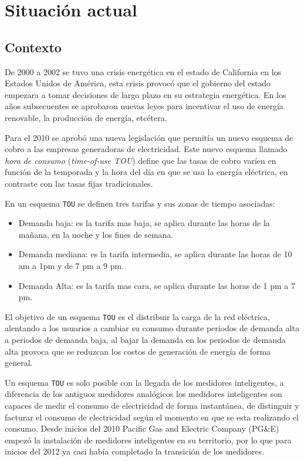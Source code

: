 \chapter{Situación actual}

\section{Contexto}
De 2000 a 2002 se tuvo una crisis energética en el estado de California en los
Estados Unidos de América, esta crisis provocó que el gobierno del estado empezara a
tomar decisiones de largo plazo en su estrategia energética. En los años
subsecuentes se aprobaron nuevas leyes para incentivar el uso de energía renovable,
la producción de energía, etcétera.

Para el 2010 se aprobó una nueva legislación que permitía un nuevo esquema
de cobro a las empresas generadoras de electricidad. Este nuevo esquema
llamado \textit{hora de consumo} (\textit{time-of-use TOU}) define que las
tasas de cobro varíen en función de la temporada y la hora del día en que
se usa la energía eléctrica, en contraste con las tasas fijas tradicionales.

En un esquema \texttt{TOU} se definen tres tarifas y sus zonas de tiempo asociadas:

\begin{itemize}
\item  Demanda baja: es la tarifa mas baja, se aplica durante las horas de la
  mañana, en la noche y los fines de semana.
\item Demanda mediana: es la tarifa intermedia, se aplica durante las horas de
  10 am a 1pm y de 7 pm a 9 pm.
\item Demanda Alta: es la tarifa mas cara, se aplica durante las horas de
  1 pm a 7 pm.
\end{itemize}

El objetivo de un esquema \texttt{TOU} es el distribuir la carga de la red
eléctrica, alentando a los usuarios a cambiar su consumo durante periodos
de demanda alta a periodos de demanda baja, al bajar la demanda en los periodos
de demanda alta provoca que se reduzcan los costos de generación de energía de
forma general.

Un esquema \texttt{TOU} es solo posible con la llegada de los medidores
inteligentes, a diferencia de los antiguos medidores analógicos los medidores
inteligentes son capaces de medir el consumo de electricidad de forma instantánea,
de distinguir y facturar el consumo de electricidad según el momento en que se
esta realizando el consumo. Desde inicios del 2010 Pacific Gas and
Electric Company (PG\&E) empezó la instalación de medidores inteligentes
en su territorio, por lo que para inicios del 2012 ya casi había
completado la transición de los medidores.

